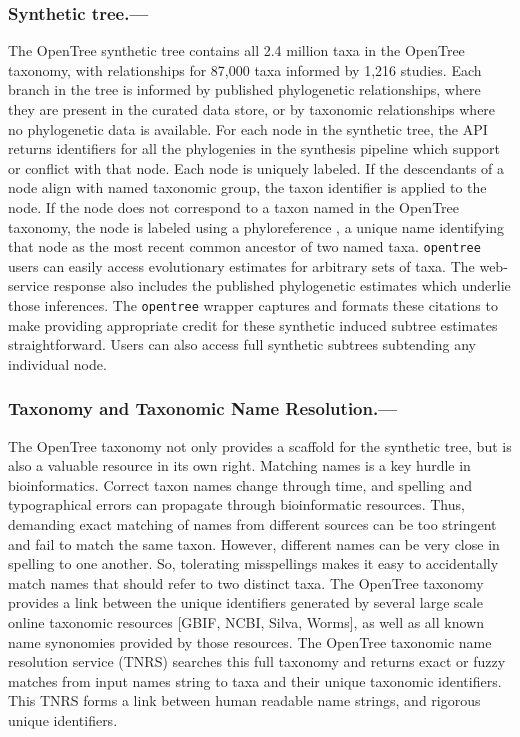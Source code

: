 \documentclass[oupdraft]{sysbio_sse}
\begin{document}
\subsubsection{Synthetic tree.---} The OpenTree synthetic tree contains all 2.4 million taxa in the OpenTree taxonomy, with relationships for 87,000 taxa informed by 1,216 studies.
Each branch in the tree is informed by published phylogenetic relationships, where they are present in the curated data store, or by taxonomic relationships where no phylogenetic data is available.
For each node in the synthetic tree, the API returns identifiers for
all the phylogenies in the synthesis pipeline which support or conflict with that node.
Each node is uniquely labeled.
If the descendants of a node align with named taxonomic group, the taxon identifier is applied to the node.
If the node does not correspond to a taxon named in the OpenTree taxonomy, the node is labeled using a phyloreference \citep{parr_evolutionary_2012}, a unique name identifying that node as the most recent common ancestor of two named taxa.
\texttt{opentree} users can easily access evolutionary estimates for arbitrary sets of taxa.
The web-service response also includes the published phylogenetic estimates which underlie those inferences.
The \texttt{opentree} wrapper captures and formats these citations to make providing appropriate credit for these synthetic induced subtree estimates straightforward.
Users can also access full synthetic subtrees subtending any individual node.


\subsubsection{Taxonomy and Taxonomic Name Resolution.---} The OpenTree taxonomy not only provides a scaffold for the synthetic tree, but is also a valuable resource in its own right.
Matching names is a key hurdle in bioinformatics.
Correct taxon names change through time, and spelling and typographical errors can propagate through bioinformatic resources.
Thus, demanding exact matching of names from different sources can be too stringent and fail to match the same taxon.
However, different names can be very close in spelling to one another.
So, tolerating misspellings makes it easy to accidentally match names that should refer to two distinct taxa.
The OpenTree taxonomy \citep{rees_automated_2017, opentreeoflife_open_2019-1} provides a link between the unique identifiers generated by several large scale online taxonomic resources [GBIF, NCBI, Silva, Worms], as well as all known name synonomies provided by those resources.
The OpenTree taxonomic name resolution service (TNRS) searches this full taxonomy and returns exact or fuzzy matches from input names string to taxa and their unique taxonomic identifiers.
This TNRS forms a link between human readable name strings, and rigorous unique identifiers.
\end{document}
